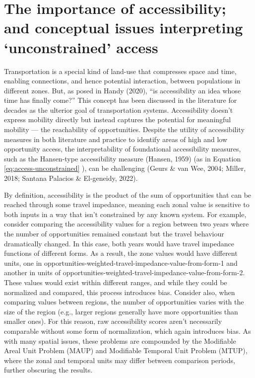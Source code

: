\documentclass[
11pt, %
oneside, %
english, %
singlespacing, %
]{macthesis} %
\begin{document}
\section{The importance of accessibility; and conceptual issues interpreting `unconstrained' access}\label{the-importance-of-accessibility-and-conceptual-issues-interpreting-unconstrained-access}

Transportation is a special kind of land-use that compresses space and time, enabling connections, and hence potential interaction, between populations in different zones. But, as posed in Handy (2020), ``is accessibility an idea whose time has finally come?'' This concept has been discussed in the literature for decades as the ulterior goal of transportation systems. Accessibility doesn't express mobility directly but instead captures the potential for meaningful mobility --- the reachability of opportunities. Despite the utility of accessibility measures in both literature and practice to identify areas of high and low opportunity access, the interpretability of foundational accessibility measures, such as the Hansen-type accessibility measure (Hansen, 1959) (as in Equation \ref{eq:access-unconstrained} ), can be challenging (Geurs \& van Wee, 2004; Miller, 2018; Santana Palacios \& El-geneidy, 2022).

By definition, accessibility is the product of the sum of opportunities that can be reached through some travel impedance, meaning each zonal value is sensitive to both inputs in a way that isn't constrained by any known system. For example, consider comparing the accessibility values for a region between two years where the number of opportunities remained constant but the travel behaviour dramatically changed. In this case, both years would have travel impedance functions of different forms. As a result, the zone values would have different units, one in opportunities-weighted-travel-impedance-value-from-form-1 and another in units of opportunities-weighted-travel-impedance-value-from-form-2. These values would exist within different ranges, and while they could be normalized and compared, this process introduces bias. Consider also, when comparing values between regions, the number of opportunities varies with the size of the region (e.g., larger regions generally have more opportunities than smaller ones). For this reason, raw accessibility scores aren't necessarily comparable without some form of normalization, which again introduces bias. As with many spatial issues, these problems are compounded by the Modifiable Areal Unit Problem (MAUP) and Modifiable Temporal Unit Problem (MTUP), where the zonal and temporal units may differ between comparison periods, further obscuring the results.
\end{document}
